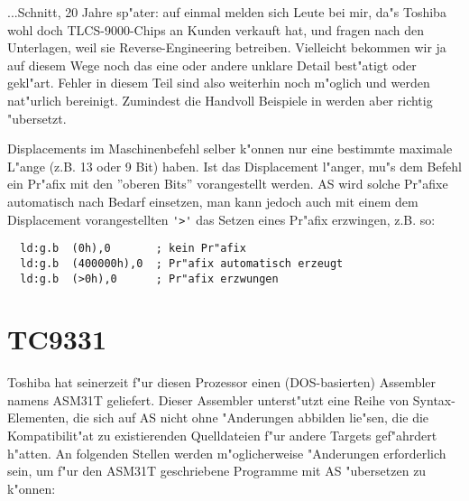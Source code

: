 \documentclass[12pt,a4paper,twoside]{report}
\begin{document}
...Schnitt, 20 Jahre sp"ater: auf einmal melden sich Leute bei
mir, da"s Toshiba wohl doch TLCS-9000-Chips an Kunden verkauft
hat, und fragen nach den Unterlagen, weil sie Reverse-Engineering
betreiben.  Vielleicht bekommen wir ja auf diesem Wege noch das
eine oder andere unklare Detail best"atigt oder gekl"art.  Fehler in
diesem Teil sind also weiterhin noch m"oglich und werden nat"urlich
bereinigt.  Zumindest die Handvoll Beispiele in \cite{Tosh9000} werden
aber richtig "ubersetzt.

Displacements im Maschinenbefehl selber k"onnen nur eine bestimmte
maximale L"ange (z.B. 13 oder 9 Bit) haben.  Ist das Displacement
l"anger, mu"s dem Befehl ein Pr"afix mit den ''oberen Bits''
vorangestellt werden.  AS wird solche Pr"afixe automatisch nach
Bedarf einsetzen, man kann jedoch auch mit einem dem Displacement
vorangestellten \verb!'>'! das Setzen eines Pr"afix erzwingen,
z.B. so:

\begin{verbatim}
  ld:g.b  (0h),0       ; kein Pr"afix
  ld:g.b  (400000h),0  ; Pr"afix automatisch erzeugt
  ld:g.b  (>0h),0      ; Pr"afix erzwungen
\end{verbatim}


\section{TC9331}

Toshiba hat seinerzeit f"ur diesen Prozessor einen (DOS-basierten)
Assembler namens ASM31T geliefert.  Dieser Assembler unterst"utzt
eine Reihe von Syntax-Elementen, die sich auf AS nicht ohne
"Anderungen abbilden lie"sen, die die Kompatibilit"at
zu existierenden Quelldateien f"ur andere Targets gef"ahrdert
h"atten.  An folgenden Stellen werden m"oglicherweise "Anderungen
erforderlich sein, um f"ur den ASM31T geschriebene Programme mit
AS "ubersetzen zu k"onnen:
\end{document}
